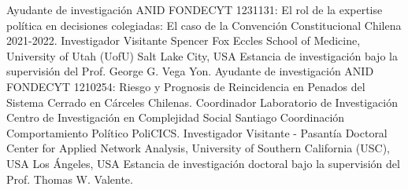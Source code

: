        {Ayudante de investigación}
        {ANID}
        {FONDECYT 1231131:}
        {El rol de la expertise política en decisiones colegiadas: El caso de la Convención Constitucional Chilena 2021-2022.}   %
        {}
        {Investigador Visitante}
        {Spencer Fox Eccles School of Medicine, University of Utah (UofU)}
        {Salt Lake City, USA}
        {\newline Estancia de investigación bajo la supervisión del Prof. George G. Vega Yon.}   %
        {}
        {Ayudante de investigación}
        {ANID}
        {FONDECYT 1210254:}
        {Riesgo y Prognosis de Reincidencia en Penados del Sistema Cerrado en Cárceles Chilenas.}   %
        {}
        {Coordinador Laboratorio de Investigación}
        {Centro de Investigación en Complejidad Social}
        {Santiago}
        {Coordinación Comportamiento Político PoliCICS.}   %
        {}
        {Investigador Visitante - Pasantía Doctoral}
        {Center for Applied Network Analysis, University of Southern California (USC), USA}
        {Los Ángeles, USA}
        {\newline Estancia de investigación doctoral bajo la supervisión del Prof. Thomas W. Valente.}   %
        {}